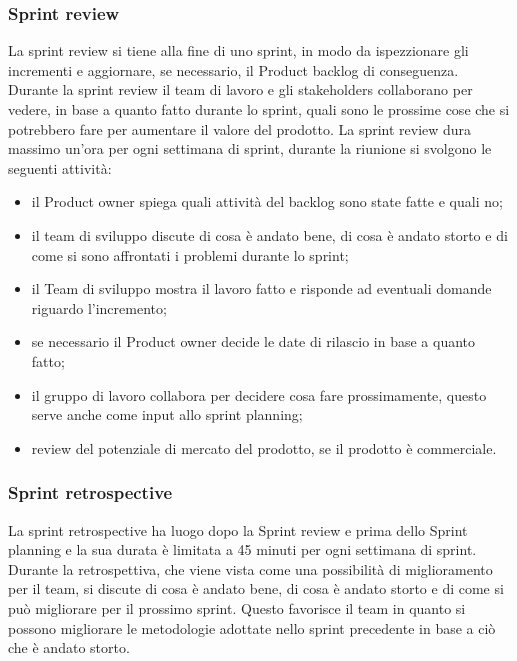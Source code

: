 \subsubsection{Sprint review}
La sprint review si tiene alla fine di uno sprint, in modo da ispezzionare gli incrementi e aggiornare, se necessario, il Product backlog di conseguenza. Durante la sprint review il team di lavoro e gli stakeholders collaborano per vedere, in base a quanto fatto durante lo sprint, quali sono le prossime cose che si potrebbero fare per aumentare il valore del prodotto. La sprint review dura massimo un'ora per ogni settimana di sprint, durante la riunione si svolgono le seguenti attività:
\begin{itemize}
    \item il Product owner spiega quali attività del backlog sono state fatte e quali no;
    \item il team di sviluppo discute di cosa è andato bene, di cosa è andato storto e di come si sono affrontati i problemi durante lo sprint;
    \item il Team di sviluppo mostra il lavoro fatto e risponde ad eventuali domande riguardo l'incremento;
    \item se necessario il Product owner decide le date di rilascio in base a quanto fatto;
    \item il gruppo di lavoro collabora per decidere cosa fare prossimamente, questo serve anche come input allo sprint planning;
    \item review del potenziale di mercato del prodotto, se il prodotto è commerciale.
\end{itemize}

\subsubsection{Sprint retrospective}
La sprint retrospective ha luogo dopo la Sprint review e prima dello Sprint planning e la sua durata è limitata a 45 minuti per ogni settimana di sprint. Durante la retrospettiva, che viene vista come una possibilità di miglioramento per il team, si discute di cosa è andato bene, di cosa è andato storto e di come si può migliorare per il prossimo sprint. Questo favorisce il team in quanto si possono migliorare le metodologie adottate nello sprint precedente in base a ciò che è andato storto.